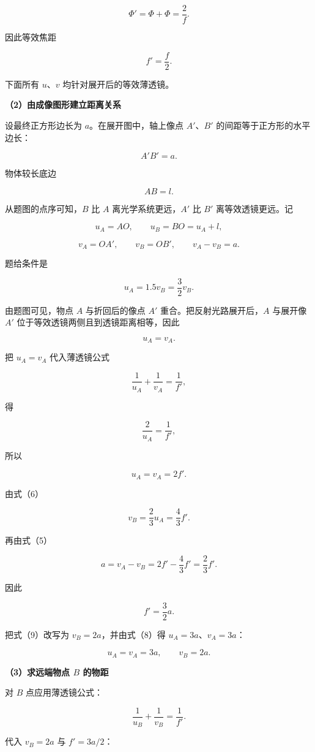 \documentclass[12pt,a4paper,UTF8]{ctexart}
\begin{document}
\[
\Phi'=\Phi+\Phi=\frac2f.
\]

因此等效焦距

\[
\boxed{f'=\frac f2}.
\tag{1}
\]

下面所有 \(u\)、\(v\) 均针对展开后的等效薄透镜。

\textbf{（2）由成像图形建立距离关系}

设最终正方形边长为 \(a\)。在展开图中，轴上像点 \(A'\)、\(B'\)
的间距等于正方形的水平边长：

\[
A'B'=a.
\tag{2}
\]

物体较长底边

\[
AB=l.
\tag{3}
\]

从题图的点序可知，\(B\) 比 \(A\) 离光学系统更远，\(A'\) 比 \(B'\)
离等效透镜更远。记

\[
u_A=AO,
\qquad
u_B=BO=u_A+l,
\tag{4}
\]

\[
v_A=OA',
\qquad
v_B=OB',
\qquad
v_A-v_B=a.
\tag{5}
\]

题给条件是

\[
u_A=1.5v_B=\frac32v_B.
\tag{6}
\]

由题图可见，物点 \(A\) 与折回后的像点 \(A'\)
重合。把反射光路展开后，\(A\) 与展开像 \(A'\)
位于等效透镜两侧且到透镜距离相等，因此

\[
u_A=v_A.
\tag{7}
\]

把 \(u_A=v_A\) 代入薄透镜公式

\[
\frac1{u_A}+\frac1{v_A}=\frac1{f'},
\]

得

\[
\frac2{u_A}=\frac1{f'},
\]

所以

\[
u_A=v_A=2f'.
\tag{8}
\]

由式（6）

\[
v_B=\frac23u_A=\frac43f'.
\tag{9}
\]

再由式（5）

\[
a=v_A-v_B
=2f'-\frac43f'
=\frac23f'.
\tag{10}
\]

因此

\[
f'=\frac32a.
\tag{11}
\]

把式（9）改写为 \(v_B=2a\)，并由式（8）得 \(u_A=3a\)、\(v_A=3a\)：

\[
\boxed{u_A=v_A=3a,\qquad v_B=2a}.
\tag{12}
\]

\textbf{（3）求远端物点 \(B\) 的物距}

对 \(B\) 点应用薄透镜公式：

\[
\frac1{u_B}+\frac1{v_B}=\frac1{f'}.
\tag{13}
\]

代入 \(v_B=2a\) 与 \(f'=3a/2\)：
\end{document}
